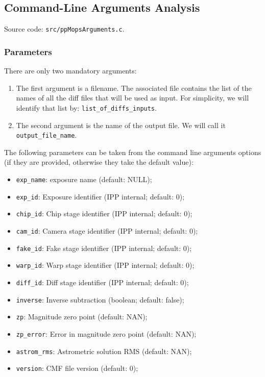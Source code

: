 \documentclass[panstarrs,spec]{panstarrs}
\begin{document}
\subsection{Command-Line Arguments Analysis}
\label{sec-implementation-args}

Source code: \texttt{src/ppMopsArguments.c}.

\subsubsection{Parameters}

There are only two mandatory arguments:
\begin{enumerate}
\item The first argument is a filename. The associated file contains
  the list of the names of all the diff files that will be used as
  input. For simplicity, we will identify that list by:
  \texttt{list\_of\_diffs\_inputs}.
\item The second argument is the name of the output file. We will call
  it \texttt{output\_file\_name}.
\end{enumerate}

The following parameters can be taken from the command line arguments
options (if they are provided, otherwise they take the default value):
\begin{itemize}
\item \texttt{exp\_name}: exposure name (default: NULL);
\item \texttt{exp\_id}: Exposure identifier (IPP internal; default: 0);
\item \texttt{chip\_id}: Chip stage identifier (IPP internal; default: 0);
\item \texttt{cam\_id}: Camera stage identifier (IPP internal; default: 0);
\item \texttt{fake\_id}: Fake stage identifier (IPP internal; default: 0);
\item \texttt{warp\_id}: Warp stage identifier (IPP internal; default: 0);
\item \texttt{diff\_id}: Diff stage identifier (IPP internal; default: 0);
\item \texttt{inverse}: Inverse subtraction (boolean; default: false);
\item \texttt{zp}: Magnitude zero point (default: NAN);
\item \texttt{zp\_error}: Error in magnitude zero point (default: NAN);
\item \texttt{astrom\_rms}: Astrometric solution RMS (default: NAN);
\item \texttt{version}: CMF file version (default: 0);
\end{itemize}
\end{document}
